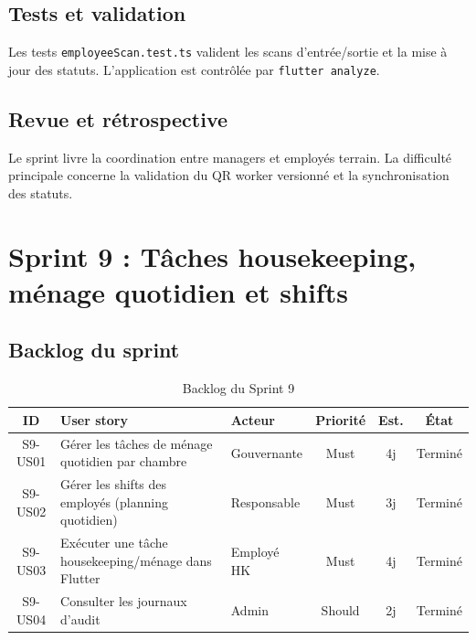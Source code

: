 
\subsection{Tests et validation}
Les tests \texttt{employeeScan.test.ts} valident les scans d'entrée/sortie et la mise à jour des statuts. L'application est contrôlée par \texttt{flutter analyze}.

\subsection{Revue et rétrospective}
Le sprint livre la coordination entre managers et employés terrain. La difficulté principale concerne la validation du QR worker versionné et la synchronisation des statuts.


\section{Sprint 9 : Tâches housekeeping, ménage quotidien et shifts}
\label{sec:sprint9}

\subsection{Backlog du sprint}
\begin{table}[H]
\centering
\caption{Backlog du Sprint 9}
\small
\begin{tabularx}{\textwidth}{|c|X|p{2.2cm}|c|c|c|}
\hline
\textbf{ID} & \textbf{User story} & \textbf{Acteur} & \textbf{Priorité} & \textbf{Est.} & \textbf{État} \\ \hline
S9-US01 & Gérer les tâches de ménage quotidien par chambre & Gouvernante & Must & 4j & Terminé \\ \hline
S9-US02 & Gérer les shifts des employés (planning quotidien) & Responsable & Must & 3j & Terminé \\ \hline
S9-US03 & Exécuter une tâche housekeeping/ménage dans Flutter & Employé HK & Must & 4j & Terminé \\ \hline
S9-US04 & Consulter les journaux d'audit & Admin & Should & 2j & Terminé \\ \hline
\end{tabularx}
\end{table}

